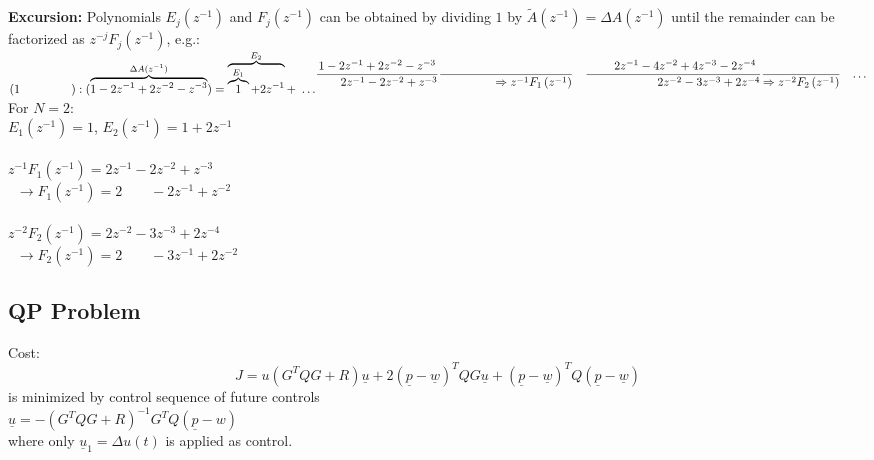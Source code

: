 \documentclass[english]{latex4ei/latex4ei_sheet}
\begin{document}
\begin{sectionbox}
\textbf{Excursion:}
Polynomials $E_{j}\left(z^{-1}\right)$ and $F_{j}\left(z^{-1}\right)$ can be obtained by dividing $1$ by $\tilde{A}(z^{-1})=\Delta A(z^{-1})$ until the remainder can be factorized as $z^{-j}F_{j}(z^{-1})$, e.g.:\\
\( \begin{aligned} (1 \qquad \ \qquad):(\overbrace{1-2z^{-1}+2z^{-2}-z^{-3}}^{\Delta A(z^{-1})})=\overbrace{\overbrace{1}^{E_1}+2z^{-1}}^{E_2}+\ \ldots \end{aligned}\\
\begin{aligned}
\frac{1-2 z^{-1}+2 z^{-2}-z^{-3}}{\qquad 2 z^{-1}-2 z^{-2}+z^{-3}} &  \frac{}{\ \ \qquad \qquad \Rightarrow z^{-1} F_{1}\left(z^{-1}\right)}
\end{aligned}\\
\begin{aligned}
\frac{\qquad 2 z^{-1}-4 z^{-2}+4 z^{-3}-2 z^{-4}}{\qquad \qquad \qquad 2z^{-2}- 3z^{-3}+2 z^{-4}} & \frac{}{\Rightarrow z^{-2} F_{2}\left(z^{-1}\right)} & \ldots \end{aligned} \)
\\
For $N=2$:\\
$E_1(z^{-1})=1$, \quad $E_2(z^{-1})=1+2z^{-1}$\\
\\
$z^{-1}F_1(z^{-1})=2z^{-1}-2z^{-2}+z^{-3}$\\ \textcolor{white}{n}$\rightarrow F_1(z^{-1})=2\qquad -2z^{-1}+z^{-2}$\\
\\
$z^{-2}F_2(z^{-1})=2z^{-2}-3z^{-3}+2z^{-4}$\\ \textcolor{white}{n}$\rightarrow F_2(z^{-1})=2\qquad -3z^{-1}+2z^{-2}$\\

\subsection{QP Problem}
Cost: $$J=u\left(G^{T} Q G+R\right) \underline{u}+2(\underline{p}-\underline{w})^{T} Q G \underline{u}+(\underline{p}-\underline{w})^{T} Q(\underline{p}-\underline{w})$$ is minimized by control sequence of future controls \\
$\underline{u}=-\left(G^{T} Q G+R\right)^{-1} G^{T} Q(\underline{p}-w)$\\
where only $\underline{u}_{1}=\Delta u(t)$ is applied as control.

\end{sectionbox}
\end{document}

